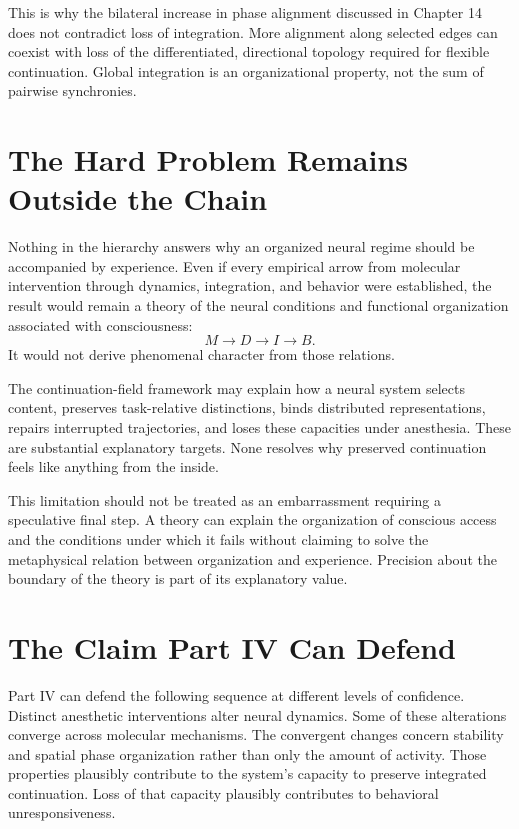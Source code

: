 \documentclass[11pt]{book}
\begin{document}
This is why the bilateral increase in phase alignment discussed in Chapter 14 does not contradict loss of integration. More alignment along selected edges can coexist with loss of the differentiated, directional topology required for flexible continuation. Global integration is an organizational property, not the sum of pairwise synchronies.

\section*{The Hard Problem Remains Outside the Chain}

Nothing in the hierarchy answers why an organized neural regime should be accompanied by experience. Even if every empirical arrow from molecular intervention through dynamics, integration, and behavior were established, the result would remain a theory of the neural conditions and functional organization associated with consciousness:
\[
M\longrightarrow D\longrightarrow I\longrightarrow B.
\]
It would not derive phenomenal character from those relations.

The continuation-field framework may explain how a neural system selects content, preserves task-relative distinctions, binds distributed representations, repairs interrupted trajectories, and loses these capacities under anesthesia. These are substantial explanatory targets. None resolves why preserved continuation feels like anything from the inside.

This limitation should not be treated as an embarrassment requiring a speculative final step. A theory can explain the organization of conscious access and the conditions under which it fails without claiming to solve the metaphysical relation between organization and experience. Precision about the boundary of the theory is part of its explanatory value.

\section*{The Claim Part IV Can Defend}

Part IV can defend the following sequence at different levels of confidence. Distinct anesthetic interventions alter neural dynamics. Some of these alterations converge across molecular mechanisms. The convergent changes concern stability and spatial phase organization rather than only the amount of activity. Those properties plausibly contribute to the system's capacity to preserve integrated continuation. Loss of that capacity plausibly contributes to behavioral unresponsiveness.
\end{document}
